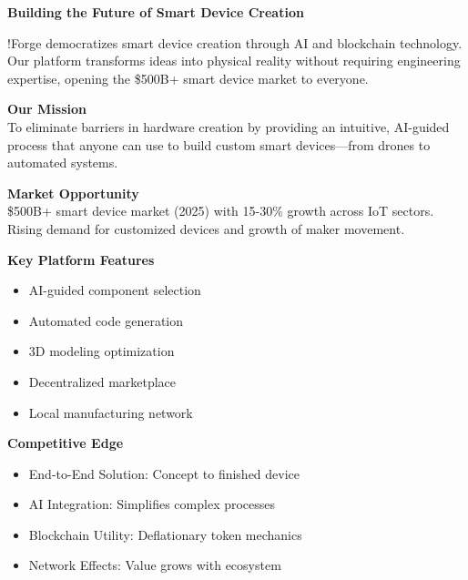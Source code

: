 \vspace{0.3cm}
\begin{center}
\textcolor{fabPrimary}{\Large\textbf{Building the Future of Smart Device Creation}}
\end{center}

\vspace{0.2cm}
\noindent !Forge democratizes smart device creation through AI and blockchain technology. Our platform transforms ideas into physical reality without requiring engineering expertise, opening the \$500B+ smart device market to everyone.

\vspace{0.2cm}
\begin{multicols}{2}
\textcolor{fabPrimary}{\textbf{Our Mission}}\\
\noindent To eliminate barriers in hardware creation by providing an intuitive, AI-guided process that anyone can use to build custom smart devices—from drones to automated systems.

\columnbreak

\textcolor{fabPrimary}{\textbf{Market Opportunity}}\\
\noindent \$500B+ smart device market (2025) with 15-30\% growth across IoT sectors. Rising demand for customized devices and growth of maker movement.
\end{multicols}

\vspace{0.2cm}
\begin{multicols}{2}
\textcolor{fabRed}{\textbf{Key Platform Features}}
\vspace{0.05cm}
\begin{itemize}[leftmargin=*, topsep=0pt, itemsep=0pt]
    \item AI-guided component selection
    \item Automated code generation
    \item 3D modeling optimization
    \item Decentralized marketplace
    \item Local manufacturing network
\end{itemize}

\columnbreak

\textcolor{fabRed}{\textbf{Competitive Edge}}
\vspace{0.05cm}
\begin{itemize}[leftmargin=*, topsep=0pt, itemsep=0pt]
    \item End-to-End Solution: Concept to finished device
    \item AI Integration: Simplifies complex processes
    \item Blockchain Utility: Deflationary token mechanics
    \item Network Effects: Value grows with ecosystem
\end{itemize}
\end{multicols}

